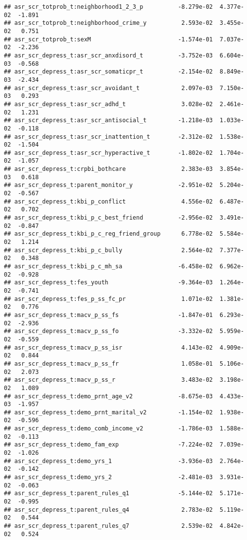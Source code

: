 \documentclass[
]{article}
\begin{document}
\begin{verbatim}
## asr_scr_totprob_t:neighborhood1_2_3_p          -8.279e-02  4.377e-02  -1.891
## asr_scr_totprob_t:neighborhood_crime_y          2.593e-02  3.455e-02   0.751
## asr_scr_totprob_t:sexM                         -1.574e-01  7.037e-02  -2.236
## asr_scr_depress_t:asr_scr_anxdisord_t          -3.752e-03  6.604e-03  -0.568
## asr_scr_depress_t:asr_scr_somaticpr_t          -2.154e-02  8.849e-03  -2.434
## asr_scr_depress_t:asr_scr_avoidant_t            2.097e-03  7.150e-03   0.293
## asr_scr_depress_t:asr_scr_adhd_t                3.028e-02  2.461e-02   1.231
## asr_scr_depress_t:asr_scr_antisocial_t         -1.218e-03  1.033e-02  -0.118
## asr_scr_depress_t:asr_scr_inattention_t        -2.312e-02  1.538e-02  -1.504
## asr_scr_depress_t:asr_scr_hyperactive_t        -1.802e-02  1.704e-02  -1.057
## asr_scr_depress_t:crpbi_bothcare                2.383e-03  3.854e-03   0.618
## asr_scr_depress_t:parent_monitor_y             -2.951e-02  5.204e-02  -0.567
## asr_scr_depress_t:kbi_p_conflict                4.556e-02  6.487e-02   0.702
## asr_scr_depress_t:kbi_p_c_best_friend          -2.956e-02  3.491e-02  -0.847
## asr_scr_depress_t:kbi_p_c_reg_friend_group      6.778e-02  5.584e-02   1.214
## asr_scr_depress_t:kbi_p_c_bully                 2.564e-02  7.377e-02   0.348
## asr_scr_depress_t:kbi_p_c_mh_sa                -6.458e-02  6.962e-02  -0.928
## asr_scr_depress_t:fes_youth                    -9.364e-03  1.264e-02  -0.741
## asr_scr_depress_t:fes_p_ss_fc_pr                1.071e-02  1.381e-02   0.776
## asr_scr_depress_t:macv_p_ss_fs                 -1.847e-01  6.293e-02  -2.936
## asr_scr_depress_t:macv_p_ss_fo                 -3.332e-02  5.959e-02  -0.559
## asr_scr_depress_t:macv_p_ss_isr                 4.143e-02  4.909e-02   0.844
## asr_scr_depress_t:macv_p_ss_fr                  1.058e-01  5.106e-02   2.073
## asr_scr_depress_t:macv_p_ss_r                   3.483e-02  3.198e-02   1.089
## asr_scr_depress_t:demo_prnt_age_v2             -8.675e-03  4.433e-03  -1.957
## asr_scr_depress_t:demo_prnt_marital_v2         -1.154e-02  1.938e-02  -0.596
## asr_scr_depress_t:demo_comb_income_v2          -1.786e-03  1.588e-02  -0.113
## asr_scr_depress_t:demo_fam_exp                 -7.224e-02  7.039e-02  -1.026
## asr_scr_depress_t:demo_yrs_1                   -3.936e-03  2.764e-02  -0.142
## asr_scr_depress_t:demo_yrs_2                   -2.481e-03  3.931e-02  -0.063
## asr_scr_depress_t:parent_rules_q1              -5.144e-02  5.171e-02  -0.995
## asr_scr_depress_t:parent_rules_q4               2.783e-02  5.119e-02   0.544
## asr_scr_depress_t:parent_rules_q7               2.539e-02  4.842e-02   0.524

\end{verbatim}
\end{document}
